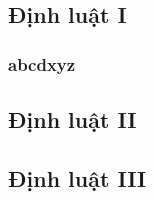 \subsection{Định luật I}
\begin{frame}
    \frametitle{abcdxyz}
\end{frame}
\subsection{Định luật II}
\subsection{Định luật III}
